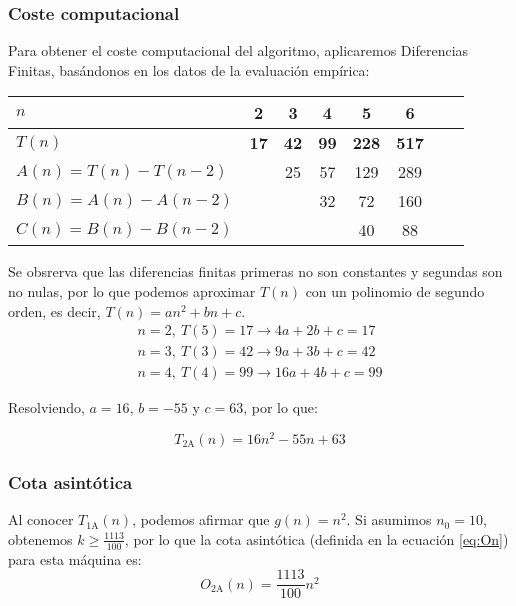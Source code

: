 \subsubsection*{Coste computacional}


Para obtener el coste computacional del algoritmo, aplicaremos Diferencias Finitas, basándonos en los datos de la evaluación empírica:


\begin{table}[h]
    \centering
    \begin{tabular}{|l|c|c|c|c|c|c|c|}
        \hline
        $n$ & \textbf{2} & \textbf{3} & \textbf{4} & \textbf{5} & \textbf{6}\\ \hline
        $T(n)$ & \textbf{17} & \textbf{42} & \textbf{99} & \textbf{228} & \textbf{517}      \\ \hline
        \hline
        $A(n) = T(n) - T(n-2)$ &    & 25 & 57 & 129 & 289 \\ \hline
        $B(n) = A(n) - A(n-2)$ &    &   & 32 & 72 & 160 \\ \hline
        $C(n) = B(n) - B(n-2)$ &    &   &    & 40 & 88 \\ \hline
    \end{tabular}
\end{table}

Se obsrerva que las diferencias finitas primeras no son constantes y segundas son no nulas, por lo que podemos aproximar $T(n)$ con un polinomio de segundo orden, es decir, $T(n) =  an^2 + bn + c$.\\

\begin{subequations}
    \begin{gather}
        n = 2,\ T(5) = 17 \rightarrow 4a + 2b + c = 17 \\
        n = 3,\ T(3) = 42 \rightarrow 9a + 3b + c = 42 \\
        n = 4,\ T(4) = 99 \rightarrow 16a + 4b + c = 99
    \end{gather}
\end{subequations}

Resolviendo, $a=16$, $b=-55$ y $c=63$, por lo que:

\begin{equation}
    T_{\mathrm{2A}}(n) = 16n^2 - 55n + 63
\end{equation}

\subsubsection*{Cota asintótica}
Al conocer $T_{\mathrm{1A}}(n)$, podemos afirmar que $g(n) = n^2$. Si asumimos $n_0 = 10$, obtenemos $k \geq \frac{1113}{100}$, por lo que la cota asintótica (definida en la ecuación \ref{eq:On}) para esta máquina es:
\begin{equation}
    O_{\mathrm{2A}}(n) = \frac{1113}{100} n^2
\end{equation}

